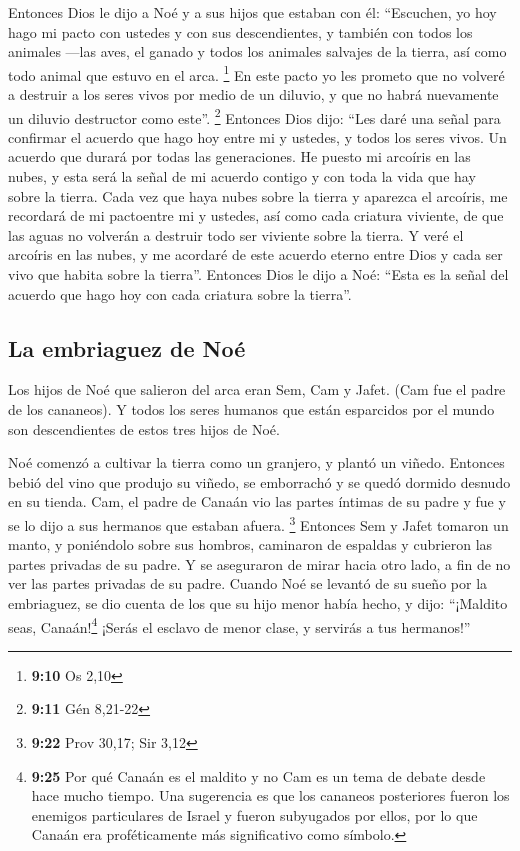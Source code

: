  Entonces Dios le dijo a Noé y a sus hijos que estaban con
él:  ``Escuchen, yo hoy hago mi pacto con ustedes y con
sus descendientes,  y también con todos los animales
---las aves, el ganado y todos los animales salvajes de la tierra, así
como todo animal que estuvo en el arca. \footnote{\textbf{9:10} Os 2,10}
 En este pacto yo les prometo que no volveré a destruir a
los seres vivos por medio de un diluvio, y que no habrá nuevamente un
diluvio destructor como este''. \footnote{\textbf{9:11} Gén 8,21-22}
 Entonces Dios dijo: ``Les daré una señal para confirmar
el acuerdo que hago hoy entre mi y ustedes, y todos los seres vivos. Un
acuerdo que durará por todas las generaciones.  He puesto
mi arcoíris en las nubes, y esta será la señal de mi acuerdo contigo y
con toda la vida que hay sobre la tierra.  Cada vez que
haya nubes sobre la tierra y aparezca el arcoíris,  me
recordará de mi pactoentre mi y ustedes, así como cada criatura
viviente, de que las aguas no volverán a destruir todo ser viviente
sobre la tierra.  Y veré el arcoíris en las nubes, y me
acordaré de este acuerdo eterno entre Dios y cada ser vivo que habita
sobre la tierra''.  Entonces Dios le dijo a Noé: ``Esta
es la señal del acuerdo que hago hoy con cada criatura sobre la
tierra''.

\hypertarget{la-embriaguez-de-nouxe9}{%
\subsection{La embriaguez de Noé}\label{la-embriaguez-de-nouxe9}}

 Los hijos de Noé que salieron del arca eran Sem, Cam y
Jafet. (Cam fue el padre de los cananeos).  Y todos los
seres humanos que están esparcidos por el mundo son descendientes de
estos tres hijos de Noé.

 Noé comenzó a cultivar la tierra como un granjero, y
plantó un viñedo.  Entonces bebió del vino que produjo su
viñedo, se emborrachó y se quedó dormido desnudo en su tienda.
 Cam, el padre de Canaán vio las partes íntimas de su
padre y fue y se lo dijo a sus hermanos que estaban afuera. \footnote{\textbf{9:22}
  Prov 30,17; Sir 3,12}  Entonces Sem y Jafet tomaron un
manto, y poniéndolo sobre sus hombros, caminaron de espaldas y cubrieron
las partes privadas de su padre. Y se aseguraron de mirar hacia otro
lado, a fin de no ver las partes privadas de su padre. 
Cuando Noé se levantó de su sueño por la embriaguez, se dio cuenta de
los que su hijo menor había hecho,  y dijo: ``¡Maldito
seas, Canaán!\footnote{\textbf{9:25} Por qué Canaán es el maldito y no
  Cam es un tema de debate desde hace mucho tiempo. Una sugerencia es
  que los cananeos posteriores fueron los enemigos particulares de
  Israel y fueron subyugados por ellos, por lo que Canaán era
  proféticamente más significativo como símbolo.} ¡Serás el esclavo de
menor clase, y servirás a tus hermanos!''

